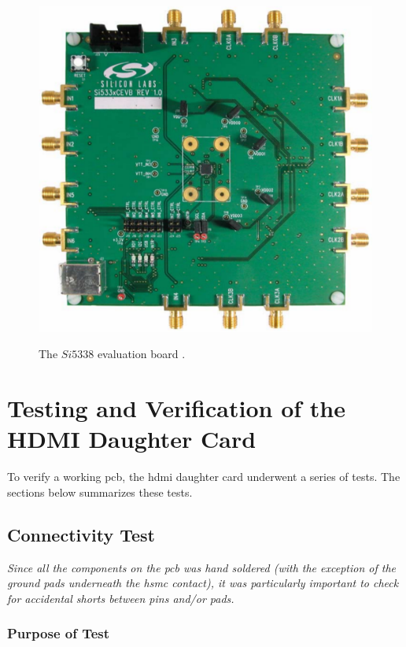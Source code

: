 \documentclass[main.tex]{subfiles}
\begin{document}
\begin{figure} %
\begin{center}
\includegraphics[scale=0.3]{../img/si5338}  \\[0.1 cm]
\caption{The $Si5338$ evaluation board \cite{si16}.}
\label{fig:si5338}
\end{center}
\end{figure} 

\section{Testing and Verification of the HDMI Daughter Card}
To verify a working \gls{pcb}, the \gls{hdmi} daughter card underwent a series of tests. The sections below summarizes these tests. 

\subsection{Connectivity Test}

\textit{Since all the components on the \gls{pcb} was hand soldered (with the exception of the ground pads underneath the \gls{hsmc} contact), it was particularly important to check for accidental shorts between pins and/or pads.}

\subsubsection{Purpose of Test}
\end{document}
